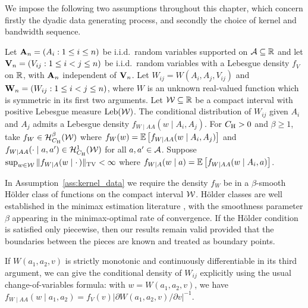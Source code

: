 We impose the following two assumptions throughout this chapter,
which concern firstly the dyadic data generating process, and
secondly the choice of kernel and bandwidth sequence.

%
\begin{assumption}
  \label{ass:kernel_data}
  Let $\mathbf{A}_n = (A_i: 1 \leq i \leq n)$ be i.i.d.\ random variables supported on
  $\mathcal{A} \subseteq \mathbb{R}$ and let $\mathbf{V}_n = (V_{i j}: 1 \leq i < j \leq n)$ be
  i.i.d.\ random variables with a Lebesgue density $f_V$ on $\mathbb{R}$, with $\mathbf{A}_n$
  independent of $\mathbf{V}_n$.
  Let $W_{i j} = W(A_i, A_j, V_{i j})$ and
  $\mathbf{W}_n = (W_{i j}: 1 \leq i < j \leq n)$, where $W$ is an unknown real-valued
  function which is symmetric in its first two arguments.
  Let $\mathcal{W} \subseteq \mathbb{R}$ be a compact interval with positive Lebesgue measure
  $\operatorname{Leb}(\mathcal{W})$. The conditional distribution of $W_{i j}$ given $A_i$ and $A_j$
  admits a Lebesgue density $f_{W \mid AA}(w \mid A_i, A_j)$.
  For $C_{\mathrm{H}} > 0$ and $\beta \geq 1$, take $f_W \in \mathcal{H}^\beta_{C_{\mathrm{H}}}(\mathcal{W})$
  where $f_{W}(w) = \mathbb{E}\left[f_{W \mid AA}(w \mid A_i,A_j)\right]$ and
  $f_{W \mid AA}(\cdot \mid a, a') \in \mathcal{H}^1_{C_{\mathrm{H}}}(\mathcal{W})$
  for all $a,a' \in \mathcal{A}$. Suppose
  $\sup_{w \in \mathcal{W}} \|f_{W \mid A}(w \mid \cdot\,)\|_{\mathrm{TV}} <\infty$ where
  $f_{W \mid A}(w \mid a) = \mathbb{E}\left[f_{W \mid AA}(w \mid A_i,a)\right]$.
\end{assumption}

In Assumption~\ref{ass:kernel_data} we require the density $f_W$ be in a
$\beta$-smooth H\"older class of functions on the compact interval $\mathcal{W}$.
H\"older classes are well established in the minimax estimation literature
\citep{stone1982optimal,gine2021mathematical},
with the smoothness parameter $\beta$ appearing
in the minimax-optimal rate of convergence. If the H\"older condition is
satisfied only piecewise, then our results remain valid provided that the
boundaries between the pieces are known and treated as boundary points.

If $W(a_1, a_2, v)$ is strictly monotonic and continuously differentiable in
its third argument, we can give the conditional density of $W_{i j}$ explicitly
using the usual change-of-variables formula: with $w=W(a_1,a_2,v)$, we have
$f_{W \mid AA}(w \mid a_1,a_2)
= f_V(v) \big|\partial W(a_1,a_2,v)/\partial v\big|^{-1}$.

